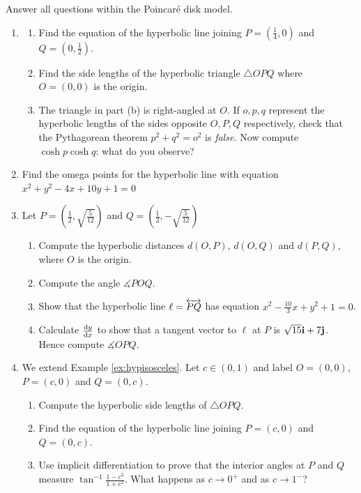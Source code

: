 \begin{exercises}
	Answer all questions within the Poincaré disk model.
	\begin{enumerate}
	  \item\begin{enumerate}
	    \item Find the equation of the hyperbolic line joining $P=(\frac 14,0)$ and $Q=(0,\frac 12)$.
	    \item Find the side lengths of the hyperbolic triangle $\triangle OPQ$ where $O=(0,0)$ is the origin.
	    \item The triangle in part (b) is right-angled at $O$. If $o,p,q$ represent the hyperbolic lengths of the sides opposite $O,P,Q$ respectively, check that the Pythagorean theorem $p^2+q^2=o^2$ is \emph{false.} Now compute $\cosh p\cosh q$: what do you observe?
	  \end{enumerate}
	  
	  
	  \item Find the omega points for the hyperbolic line with equation $x^2+y^2-4x+10y+1=0$
	  	
	  \item Let $P=\left(\frac 12,\sqrt{\frac 5{12}}\right)$ and $Q=\left(\frac 12,-\sqrt{\frac 5{12}}\right)$
	  \begin{enumerate}
	    \item Compute the hyperbolic distances $d(O,P)$, $d(O,Q)$ and $d(P,Q)$, where $O$ is the origin.
	    \item Compute the angle $\measuredangle POQ$.
		  \item Show that the hyperbolic line $\ell=\lin{PQ}$ has equation $x^2-\frac{10}3x+y^2+1=0$.
	  	\item Calculate $\diff[y]{x}$ to show that a tangent vector to $\ell$ at $P$ is $\sqrt{15}\vi+7\vj$. Hence compute $\measuredangle OPQ$.
		\end{enumerate} 
		
	  \item\label{exs:isorighthypextended} We extend Example \ref{ex:hypisosceles}. Let $c\in(0,1)$ and label $O=(0,0)$, $P=(c,0)$ and $Q=(0,c)$.
	  \begin{enumerate}
	    \item Compute the hyperbolic side lengths of $\triangle OPQ$.
	    \item Find the equation of the hyperbolic line joining $P=(c,0)$ and $Q=(0,c)$.
	    \item Use implicit differentiation to prove that the interior angles at $P$ and $Q$ measure $\tan^{-1}\frac{1-c^2}{1+c^2}$. What happens as $c\to 0^+$ and as $c\to 1^-$?
	  \end{enumerate}
		

\end{enumerate}
\end{exercises}
